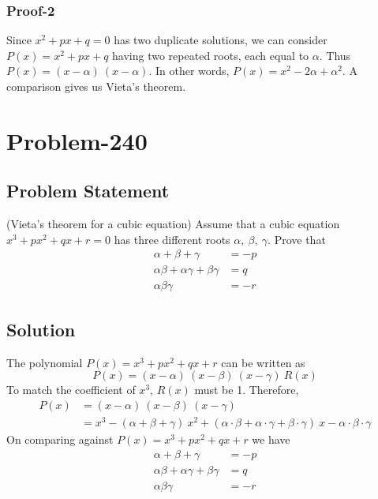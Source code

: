 \documentclass[12pt]{article}
\begin{document}
\subsubsection{Proof-2}
Since $x^2+px+q = 0$ has two duplicate solutions, we can consider $P(x) = x^2 + px + q$ having two repeated roots, each equal to $\alpha$. Thus $P(x) = (x-\alpha)\ (x-\alpha)$. In other words, $P(x) = x^2 - 2\alpha + \alpha^2$. A comparison gives us Vieta's theorem.


\section*{Problem-240}
\subsection*{Problem Statement}
(Vieta's theorem for a cubic equation) Assume that a cubic equation $x^3 + px^2 + qx + r = 0$ has three different roots $\alpha,\ \beta,\ \gamma$. Prove that
\begin{equation*}
	\begin{aligned}
		\alpha + \beta + \gamma &= -p\\
		\alpha \beta + \alpha \gamma + \beta \gamma &= q\\
		\alpha \beta \gamma &= -r
	\end{aligned}
\end{equation*}

\subsection{Solution}
The polynomial $P(x) = x^3 + px^2 + qx + r$ can be written as
\[
	P(x) = (x - \alpha)\ (x - \beta)\ (x - \gamma)\ R(x)
\]
To match the coefficient of $x^3$, $R(x)$ must be 1. Therefore,
\begin{equation*}
		\begin{aligned}
			P(x) &= (x - \alpha)\ (x - \beta)\ (x - \gamma)\\
				 &= x^3 - (\alpha + \beta + \gamma)\ x^2 + ( \alpha \cdot \beta + \alpha \cdot \gamma + \beta \cdot \gamma )\ x - \alpha\cdot \beta\cdot \gamma
		\end{aligned}
\end{equation*}
On comparing against $P(x) = x^3 + px^2 + qx + r$ we have
\begin{equation*}
	\begin{aligned}
		\alpha + \beta + \gamma &= -p\\
		\alpha \beta + \alpha \gamma + \beta \gamma &= q\\
		\alpha \beta \gamma &= -r
	\end{aligned}
\end{equation*}
\end{document}
